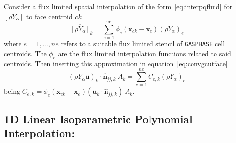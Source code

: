 Consider a flux limited spatial interpolation of the form~\eqref{eq:interpqfluid} for $[\rho Y_\alpha]$ to face centroid $ck$
%
\begin{equation}
  \overline{[\rho Y_\alpha]}_k = \sum^{ne}_{e=1} \overline{\phi}_e(\mathbf{x}_{ck}-\mathbf{x}_e) \left( \rho Y_{\alpha} \right)_e
\end{equation}
%
where $e=1,...,ne$ refers to a suitable flux limited stencil of \texttt{GASPHASE} cell centroids. The $\overline{\phi}_e$ are the flux limited interpolation functions  related to said centroids. Then inserting this approximation in equation~\eqref{eq:convgcutface}
%
\begin{equation}
  \left( \rho Y_\alpha \mathbf{u} \right)_k \cdot \hat{\mathbf{n}}_{jj,k} \: A_k = \sum^{ne}_{e=1}  C_{e,k} \left( \rho Y_{\alpha} \right)_e
\end{equation}
being $C_{e,k}=\overline{\phi}_e(\mathbf{x}_{ck}-\mathbf{x}_e) \left( \mathbf{u}_k \cdot \hat{\mathbf{n}}_{jj,k} \right) \: A_k$.


\subsection*{1D Linear Isoparametric Polynomial Interpolation:}

